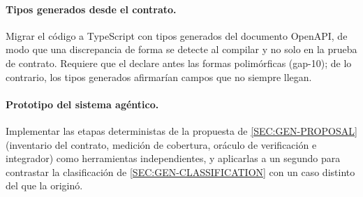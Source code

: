 \paragraph{Tipos generados desde el contrato.} Migrar el código a TypeScript con tipos
generados del documento OpenAPI, de modo que una discrepancia de forma se detecte al
compilar y no solo en la prueba de contrato. Requiere que el  declare antes las
formas polimórficas (gap-10); de lo contrario, los tipos generados afirmarían campos que no
siempre llegan.

\paragraph{Prototipo del sistema agéntico.} Implementar las etapas deterministas de la
propuesta de \cref{SEC:GEN-PROPOSAL} (inventario del contrato, medición de cobertura,
oráculo de verificación e integrador) como herramientas independientes, y aplicarlas a un
segundo  para contrastar la clasificación de \cref{SEC:GEN-CLASSIFICATION} con
un caso distinto del que la originó.

